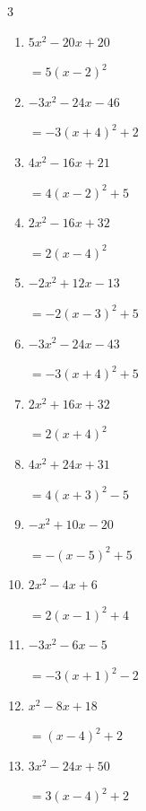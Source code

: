 \begin{multicols}{3}
\begin{enumerate}
        $=2\left( x-5\right)^{2}-1$

  \item $5x^{2}-20x+20$

        $=5\left( x-2\right)^{2}$

  \item $-3x^{2}-24x-46$

        $=-3\left( x+4\right)^{2}+2$

\columnbreak %

\resetques

  \item $4x^{2}-16x+21$

        $=4\left( x-2\right)^{2}+5$

  \item $2x^{2}-16x+32$

        $=2\left( x-4\right)^{2}$

  \item $-2x^{2}+12x-13$

        $=-2\left( x-3\right)^{2}+5$

  \item $-3x^{2}-24x-43$

        $=-3\left( x+4\right)^{2}+5$

  \item $2x^{2}+16x+32$

        $=2\left( x+4\right)^{2}$

  \item $4x^{2}+24x+31$

        $=4\left( x+3\right)^{2}-5$

  \item $-x^{2}+10x-20$

        $=-\left( x-5\right)^{2}+5$

  \item $2x^{2}-4x+6$

        $=2\left( x-1\right)^{2}+4$

  \item $-3x^{2}-6x-5$

        $=-3\left( x+1\right)^{2}-2$

  \item $x^{2}-8x+18$

        $=\left( x-4\right)^{2}+2$

\columnbreak %

  \item $3x^{2}-24x+50$

        $=3\left( x-4\right)^{2}+2$


\end{enumerate}
\end{multicols}
